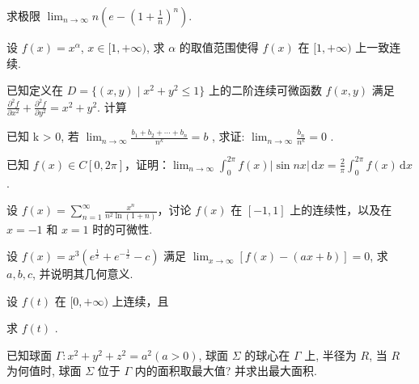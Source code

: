 求极限 $\lim_{n\to \infty}n\left(e - \left(1 + \frac{1}{n}\right)^n\right)$.\par
设 $f(x) = x^{\alpha}$, $x \in [1, +\infty)$, 求 $\alpha$ 的取值范围使得 $f(x)$ 在 $[1, +\infty)$ 上一致连续.\par
\par{}
已知定义在 $D = \{(x, y) \mid x^2 + y^2 \leq 1\}$ 上的二阶连续可微函数 $f(x, y)$ 满足 $\frac{\partial^2 f}{\partial x^2} + \frac{\partial^2 f}{\partial y^2} = x^2 + y^2$. 计算\par
\nopagebreak[4]
已知 k > 0, 若  $\lim_{n\to\infty}\frac{b_{1}+b_{2}+\cdots+b_{n}}{n^{k}}=b$ , 求证:  $\lim_{n\to\infty}\frac{b_{n}}{n^{k}}=0$ .\par
已知 $f(x) \in C[0, 2\pi]$，证明：$\lim_{n \to \infty} \int_{0}^{2\pi} f(x) |\sin nx| \, \mathrm{d}x = \frac{2}{\pi} \int_{0}^{2\pi} f(x) \, \mathrm{d}x$.\par
设 $f(x) = \sum_{n=1}^{\infty} \frac{x^n}{n^2 \ln(1+n)}$，讨论 $f(x)$ 在 $[-1, 1]$ 上的连续性，以及在 $x = -1$ 和 $x = 1$ 时的可微性.\par
设 $f(x) = x^3 \left(e^{\frac{1}{x}} + e^{-\frac{1}{x}} - c\right)$ 满足 $\lim_{x \to \infty} [f(x) - (ax + b)] = 0$, 求 $a, b, c$, 并说明其几何意义.\par
\par{}
设 $f(t)$ 在 $[0, +\infty)$ 上连续，且\par
\nopagebreak[4]
求 $f(t)$ .\par
已知球面 $\Gamma: x^{2} + y^{2} + z^{2} = a^{2} (a > 0)$, 球面 $\Sigma$ 的球心在 $\Gamma$ 上, 半径为 $R$, 当 $R$ 为何值时, 球面 $\Sigma$ 位于 $\Gamma$ 内的面积取最大值? 并求出最大面积.\par
